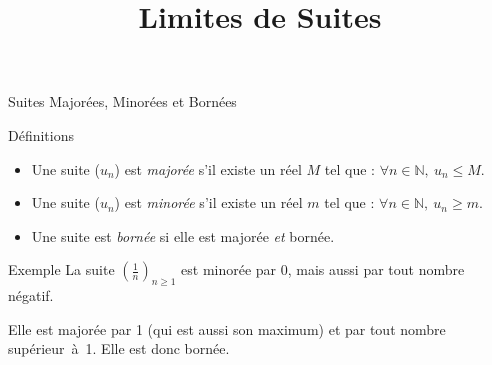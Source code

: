\documentclass{cours}
\title{Limites de Suites}
\begin{document}

    \begin{Gpartie}{Suites Majorées, Minorées et Bornées} 
        \begin{Spartie}{Définitions} 
            \begin{itemize}
                \item Une suite ($u_n$) est \emph{majorée} s'il existe un réel $M$ tel que : $\forall n\in\mathbb{N},~u_n\leq M$.
                \item Une suite ($u_n$) est \emph{minorée} s'il existe un réel $m$ tel que : $\forall n\in\mathbb{N},~u_n\geq m$.
                \item Une suite est \emph{bornée} si elle est majorée \emph{et} bornée.
            \end{itemize}
        \end{Spartie}
        \begin{Spartie}{Exemple} 
            La suite $\left(\frac{1}{n}\right)_{n\geq 1}$ est minorée par 0, mais aussi par tout nombre négatif. 
            
            Elle est majorée par 1 (qui est aussi son maximum) et par tout nombre supérieur~à~1. Elle est donc bornée.
        \end{Spartie}
    \end{Gpartie}
\end{document}
